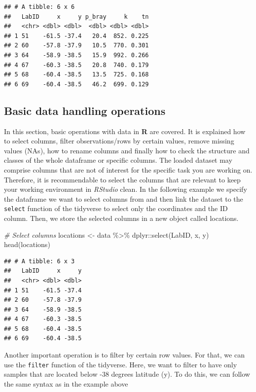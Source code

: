 \documentclass[
  10pt,
  b5paper,
  oneside]{book}
\newenvironment{Shaded}{\begin{snugshade}}{\end{snugshade}}
\newcommand{\CommentTok}[1]{\textcolor[rgb]{0.56,0.35,0.01}{\textit{#1}}}
\newcommand{\FunctionTok}[1]{\textcolor[rgb]{0.00,0.00,0.00}{#1}}
\newcommand{\NormalTok}[1]{#1}
\newcommand{\OtherTok}[1]{\textcolor[rgb]{0.56,0.35,0.01}{#1}}
\newcommand{\SpecialCharTok}[1]{\textcolor[rgb]{0.00,0.00,0.00}{#1}}
\begin{document}
\begin{verbatim}
## # A tibble: 6 x 6
##   LabID     x     y p_bray     k    tn
##   <chr> <dbl> <dbl>  <dbl> <dbl> <dbl>
## 1 51    -61.5 -37.4   20.4  852. 0.225
## 2 60    -57.8 -37.9   10.5  770. 0.301
## 3 64    -58.9 -38.5   15.9  992. 0.266
## 4 67    -60.3 -38.5   20.8  740. 0.179
## 5 68    -60.4 -38.5   13.5  725. 0.168
## 6 69    -60.4 -38.5   46.2  699. 0.129
\end{verbatim}

\hypertarget{basic-data-handling-operations}{%
\subsection{Basic data handling operations}\label{basic-data-handling-operations}}

In this section, basic operations with data in \textbf{R} are covered. It is explained how to select columns, filter observations/rows by certain values, remove missing values (NAs), how to rename columns and finally how to check the structure and classes of the whole dataframe or specific columns.
The loaded dataset may comprise columns that are not of interest for the specific task you are working on. Therefore, it is recommendable to select the columns that are relevant to keep your working environment in \emph{RStudio} clean. In the following example we specify the dataframe we want to select columns from and then link the dataset to the \texttt{select} function of the tidyverse to select only the coordinates and the ID column. Then, we store the selected columns in a new object called locations.

\begin{Shaded}
\begin{Highlighting}[]
\CommentTok{\# Select columns}
\NormalTok{locations }\OtherTok{\textless{}{-}}\NormalTok{ data }\SpecialCharTok{\%\textgreater{}\%}\NormalTok{ dplyr}\SpecialCharTok{::}\FunctionTok{select}\NormalTok{(LabID, x, y)}
\FunctionTok{head}\NormalTok{(locations)}
\end{Highlighting}
\end{Shaded}

\begin{verbatim}
## # A tibble: 6 x 3
##   LabID     x     y
##   <chr> <dbl> <dbl>
## 1 51    -61.5 -37.4
## 2 60    -57.8 -37.9
## 3 64    -58.9 -38.5
## 4 67    -60.3 -38.5
## 5 68    -60.4 -38.5
## 6 69    -60.4 -38.5
\end{verbatim}

Another important operation is to filter by certain row values. For that, we can use the \texttt{filter} function of the tidyverse. Here, we want to filter to have only samples that are located below -38 degrees latitude (y). To do this, we can follow the same syntax as in the example above
\end{document}

